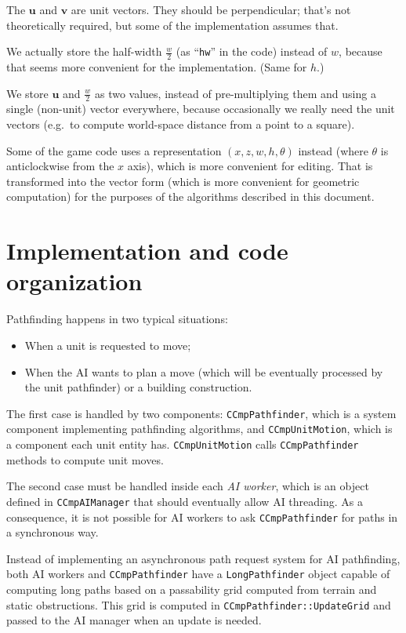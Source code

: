 \documentclass[a4paper,10pt]{article}
\begin{document}
The $\mathbf{u}$ and $\mathbf{v}$ are unit vectors.
They should be perpendicular; that's not theoretically required,
but some of the implementation assumes that.

We actually store the half-width $\frac{w}{2}$ (as ``\texttt{hw}'' in the code)
instead of $w$, because that seems more convenient for the implementation.
(Same for $h$.)

We store $\mathbf{u}$ and $\frac{w}{2}$ as two values,
instead of pre-multiplying them and using a single (non-unit) vector everywhere,
because occasionally we really need the unit vectors (e.g.\ to compute
world-space distance from a point to a square).

Some of the game code uses a representation $(x, z, w, h, \theta)$ instead
(where $\theta$ is anticlockwise from the $x$ axis),
which is more convenient for editing.
That is transformed into the vector form
(which is more convenient for geometric computation)
for the purposes of the algorithms described in this document.

\section{Implementation and code organization}

Pathfinding happens in two typical situations:
\begin{itemize}
\item When a unit is requested to move;
\item When the AI wants to plan a move (which will be eventually processed by the unit pathfinder) or a building construction.
\end{itemize}

The first case is handled by two components: \texttt{CCmpPathfinder}, which is a system component implementing pathfinding algorithms, and \texttt{CCmpUnitMotion}, which is a component each unit entity has. \texttt{CCmpUnitMotion} calls \texttt{CCmpPathfinder} methods to compute unit moves.

The second case must be handled inside each \emph{AI worker}, which is an object defined in \texttt{CCmpAIManager} that should eventually allow AI threading. As a consequence, it is not possible for AI workers to ask \texttt{CCmpPathfinder} for paths in a synchronous way.

Instead of implementing an asynchronous path request system for AI pathfinding, both AI workers and \texttt{CCmpPathfinder} have a \texttt{LongPathfinder} object capable of computing long paths based on a passability grid computed from terrain and static obstructions. This grid is computed in \texttt{CCmpPathfinder::UpdateGrid} and passed to the AI manager when an update is needed.
\end{document}

